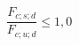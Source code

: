 \documentclass[12pt]{article}
\begin{document}
\begin{displaymath}
\frac {F_{c;s;d}} {F_{c;u;d}} \leq 1,0
\end{displaymath}
\end{document}
